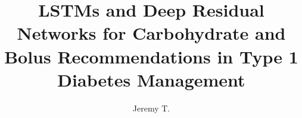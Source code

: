 \documentclass[numbered,pdftex]{ohio-etd}
\title     {LSTMs and Deep Residual Networks for Carbohydrate and Bolus Recommendations in Type 1 Diabetes Management}
\author    {Jeremy T.}{Beauchamp}
\begin{document}
\justifying

\makefrontmatter    %















\appendix           %

\end{document}
